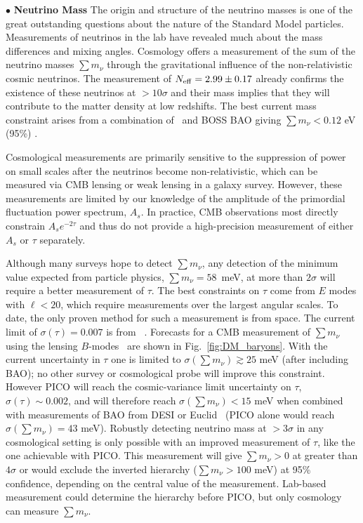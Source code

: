 \documentclass[PICOReport.tex]{subfiles}
\begin{document}
\noindent$\bullet$ {\bf Neutrino Mass} \hspace{0.1in} \label{neutrino_fundamental} The origin and structure of the neutrino masses is one of the great outstanding  questions about the nature of the Standard Model particles.  Measurements of neutrinos in the lab have revealed much  about the mass differences and mixing angles.  Cosmology offers a  measurement of the sum of the neutrino masses $\sum m_\nu$ through the gravitational influence of the non-relativistic  cosmic neutrinos.  The measurement of ${N_{\rm eff}} = 2.99 \pm 0.17$ \cite{Planck2018_VI} already confirms the existence of these neutrinos at $>10\sigma$ and their mass implies that they will contribute to the matter density at low redshifts.  The best current mass constraint arises from a combination of  \planck~and BOSS \ac{BAO} giving $\sum m_\nu < 0.12$ eV (95\%) \cite{Planck2018_VI}.

Cosmological measurements are primarily sensitive to the suppression of power on small scales after the neutrinos become non-relativistic, which can be measured via CMB lensing or weak lensing in a galaxy survey.  However, these measurements are limited by our knowledge of the amplitude of the primordial fluctuation power spectrum, $A_s$.  In practice, CMB observations most directly constrain $A_s e^{-2 \tau}$ and thus do not provide a high-precision measurement of either $A_s$ or $\tau$ separately.  


Although many surveys hope to detect $\sum m_\nu$, any detection of the minimum value expected from particle physics, $\sum m_\nu = 58$~meV, at more than $2 \sigma$ will require a better measurement of $\tau$.  The best constraints on $\tau$ come from $E$ modes with $\ell < 20$, which require measurements over the largest angular scales. To date, the only proven method for such a measurement is from space. The current limit of $\sigma({\tau}) = 0.007$ is from \planck~\cite{planck2016_xlvi}.  Forecasts for a CMB measurement of $\sum m_\nu$ using the lensing $B$-modes~\cite{Kaplinghat:2003bh} are shown in Fig.~\ref{fig:DM_baryons}.  With the current uncertainty in $\tau$ one is limited to  $\sigma(\sum m_\nu) \gtrsim 25$ meV (after including \ac{BAO}); no other survey or cosmological probe will improve this constraint. However PICO will reach the cosmic-variance limit uncertainty on $\tau$, $\sigma(\tau) \sim 0.002$, and will therefore reach $\sigma(\sum m_\nu) < 15$ meV when combined with measurements of \ac{BAO} from DESI or Euclid~\cite{Levi:2013gra} (PICO alone would reach $\sigma(\sum m_\nu) = 43$ meV).  Robustly detecting neutrino mass at  $> 3\sigma$ in any cosmological setting is only possible with an improved measurement of $\tau$, like the one achievable with PICO. This measurement will give $\sum m_\nu>0$ at greater than $4\sigma$ or would exclude the inverted hierarchy ($\sum m_\nu > 100$ meV) at 95\% confidence, depending on the central value of the measurement.  Lab-based measurement could determine the hierarchy before PICO, but only cosmology can measure $\sum m_\nu$.
\end{document}
